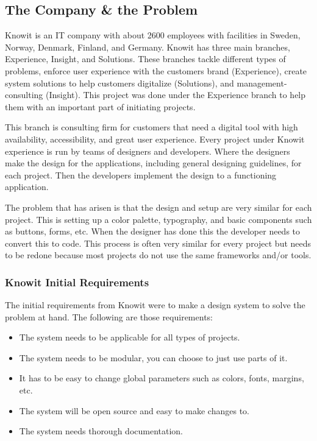 

\subsection{The Company \& the Problem}
Knowit is an IT company with about 2600 employees with facilities in Sweden, Norway, Denmark, Finland, and Germany. Knowit has three main branches, Experience, Insight, and Solutions. These branches tackle different types of problems, enforce user experience with the customers brand (Experience), create system solutions to help customers digitalize (Solutions), and management-consulting (Insight). This project was done under the Experience branch to help them with an important part of initiating projects.

This branch is consulting firm for customers that need a digital tool with high availability, accessibility, and great user experience. Every project under Knowit experience is run by teams of designers and developers. Where the designers make the design for the applications, including general designing guidelines, for each project. Then the developers implement the design to a functioning application.  

The problem that has arisen is that the design and setup are very similar for each project. This is setting up a color palette, typography, and basic components such as buttons, forms, etc. When the designer has done this the developer needs to convert this to code. This process is often very similar for every project but needs to be redone because most projects do not use the same frameworks and/or tools. 

\subsubsection{Knowit Initial Requirements}%
\label{ssub:Knowit Initial Requirements}
The initial requirements from Knowit were to make a design system\cite{fanguyComprehensiveGuideDesign} to solve the problem at hand. The following are those requirements: 
\begin{itemize}
  \item The system needs to be applicable for all types of projects.
  \item The system needs to be modular, you can choose to just use parts of it.
  \item It has to be easy to change global parameters such as colors, fonts, margins, etc.
  \item The system will be open source and easy to make changes to.
  \item The system needs thorough documentation.
\end{itemize}

